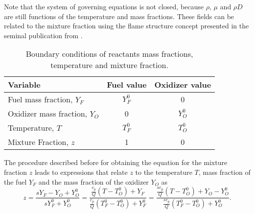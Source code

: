 Note that the system of governing equations is not closed, because $\rho$, $\mu$ and $\rho D$ are still functions of the temperature and mass fractions. These fields can be related to the mixture fraction using the flame structure concept presented in the seminal publication from \textcite{burkeDiffusionFlames1928}. 

\begin{table}[]
	\centering
	\begin{tabular}{lcc}
		\hline
		Variable                      & \multicolumn{1}{l}{Fuel value} & \multicolumn{1}{l}{Oxidizer value} \\ \hline
		Fuel mass fraction, $Y_F$     & $Y_F^0$                              & 0                                        \\
		Oxidizer mass fraction, $Y_O$ & 0                                    & $Y_O^0$                                  \\
		Temperature, $T$              & $T_F^0$                              & $T_O^0$                                  \\
		Mixture Fraction, $z$         & 1                                    & 0                                        \\ \hline
	\end{tabular}
	\caption{Boundary conditions of reactants mass fractions, temperature and mixture fraction. }
	\label{tab:BCMixtureFraction}
\end{table}

The procedure described before for obtaining the equation for the mixture fraction $z$ leads to expressions that relate $z$ to the temperature $T$, mass fraction of the fuel $Y_F$ and the mass fraction of the oxidizer $Y_O$ as
\begin{equation}
	z = \frac{s Y_F -Y_O +Y_O^0}{sY_F^0+Y_O^0} = \frac{\frac{c_p}{Q}(T-T_O^0)+Y_F }{\frac{c_p}{Q}(T_F^0-T_O^0)+Y_F^0} = \frac{\frac{s c_p}{Q}(T-T_O^0)+Y_O-Y_O^0 }{\frac{sc_p}{Q}(T_F^0-T_O^0)+Y_O^0}. \label{eq:AllMFRelationships}
\end{equation}


